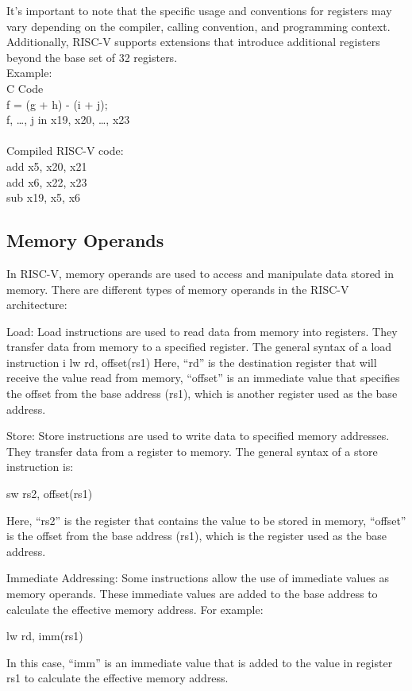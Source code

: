             It's important to note that the specific usage and conventions for registers may vary depending on the compiler, calling convention, and programming context. Additionally, RISC-V supports extensions that introduce additional registers beyond the base set of 32 registers.\\
            Example: \\
            C Code \\
            f = (g + h) - (i + j); \\
            f, …, j in x19, x20, …, x23 \\
            \\
            Compiled RISC-V code: \\
            add x5, x20, x21\\
            add x6, x22, x23\\
            sub x19, x5, x6\\
            
        \subsection{Memory Operands}
            In RISC-V, memory operands are used to access and manipulate data stored in memory. There are different types of memory operands in the RISC-V architecture:
            
            Load: Load instructions are used to read data from memory into registers. They transfer data from memory to a specified register. The general syntax of a load instruction i
            lw rd, offset(rs1)
            Here, ``rd'' is the destination register that will receive the value read from memory, ``offset'' is an immediate value that specifies the offset from the base address (rs1), which is another register used as the base address.
            
            Store: Store instructions are used to write data to specified memory addresses. They transfer data from a register to memory. The general syntax of a store instruction is:
            \begin{center}
            sw rs2, offset(rs1)
            \end{center}
            Here, ``rs2'' is the register that contains the value to be stored in memory, ``offset'' is the offset from the base address (rs1), which is the register used as the base address.
            
            Immediate Addressing: Some instructions allow the use of immediate values as memory operands. These immediate values are added to the base address to calculate the effective memory address. For example:
            \begin{center}
            lw rd, imm(rs1)
            \end{center}
            In this case, ``imm'' is an immediate value that is added to the value in register rs1 to calculate the effective memory address.
            
